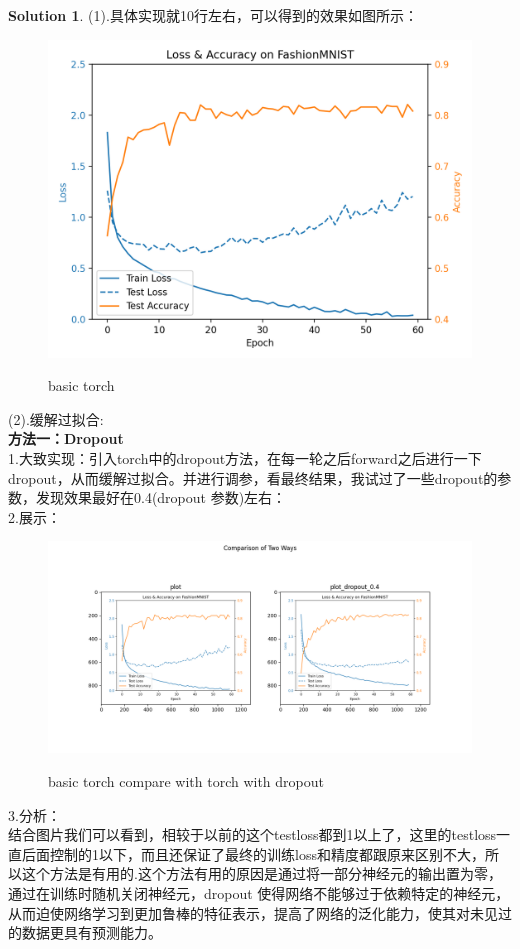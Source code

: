 \documentclass[a4paper,UTF8]{article}
\numberwithin{equation}{section}
\theoremstyle{definition}
\newtheorem*{solution}{Solution}
\begin{document}
\begin{solution} 
(1).具体实现就10行左右，可以得到的效果如图所示：
\begin{figure}[H]
    \centering
    \includegraphics[width=1\textwidth]{plot.png}\\
    \caption{basic torch}
    \label{fig:basic torch}
\end{figure} 

(2).缓解过拟合:\\
\textbf{方法一：Dropout}\\
1.大致实现：引入torch中的dropout方法，在每一轮之后forward之后进行一下dropout，从而缓解过拟合。并进行调参，看最终结果，我试过了一些dropout的参数，发现效果最好在0.4(dropout 参数)左右：\\
2.展示：
\begin{figure}[H]
    \centering
    \includegraphics[width=1.1\textwidth]{compare.png}\\
    \caption{basic torch compare with torch with dropout}
    \label{fig:basic torch compare with torch with dropout}
\end{figure} 
3.分析：\\
结合图片我们可以看到，相较于以前的这个testloss都到1以上了，这里的testloss一直后面控制的1以下，而且还保证了最终的训练loss和精度都跟原来区别不大，所以这个方法是有用的.这个方法有用的原因是通过将一部分神经元的输出置为零，通过在训练时随机关闭神经元，dropout 使得网络不能够过于依赖特定的神经元，从而迫使网络学习到更加鲁棒的特征表示，提高了网络的泛化能力，使其对未见过的数据更具有预测能力。\\


\end{solution}
\end{document}
